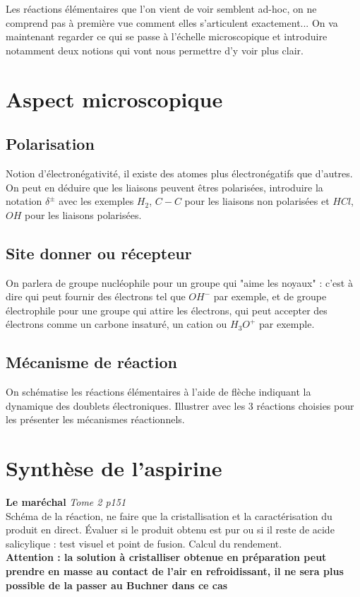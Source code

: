 \documentclass[12pt,prb,aps,epsf]{article}
\begin{document}
Les réactions élémentaires que l'on vient de voir semblent ad-hoc, on ne comprend pas à première vue comment elles s'articulent exactement... On va maintenant regarder ce qui se passe à l'échelle microscopique et introduire notamment deux notions qui vont nous permettre d'y voir plus clair.


\section{Aspect microscopique}

\subsection{Polarisation}

Notion d'électronégativité, il existe des atomes plus électronégatifs que d'autres. On peut en déduire que les liaisons peuvent êtres polarisées, introduire la notation $\delta^{\pm}$ avec les exemples $H_2$, $C-C$ pour les liaisons non polarisées et $HCl$, $OH$ pour les liaisons polarisées.

\subsection{Site donner ou récepteur}

On parlera de groupe nucléophile pour un groupe qui "aime les noyaux" : c'est à dire qui peut fournir des électrons tel que $OH^-$ par exemple, et de groupe électrophile pour une groupe qui attire les électrons, qui peut accepter des électrons comme un carbone insaturé, un cation ou $H_3O^+$ par exemple.
	
\subsection{Mécanisme de réaction}
On schématise les réactions élémentaires à l'aide de flèche indiquant la dynamique des doublets électroniques. Illustrer avec les 3 réactions choisies pour les présenter les mécanismes réactionnels.


\section{Synthèse de l'aspirine}
\textbf{Le maréchal} \textit{ Tome 2 p151}\\
Schéma de la réaction, ne faire que la cristallisation et la caractérisation du produit en direct. Évaluer si le produit obtenu est pur ou si il reste de acide salicylique : test visuel et point de fusion. Calcul du rendement.\\
\textbf{Attention : la solution à cristalliser obtenue en préparation peut prendre en masse au contact de l'air en refroidissant, il ne sera plus possible de la passer au Buchner dans ce cas}\\
\end{document}
